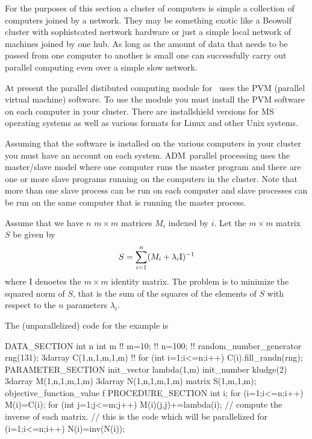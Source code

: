 %
%

For the purposes of this section a cluster of computers is
simple a collection of computers joined by a network. They may be
something exotic like a Beowolf cluster with sophistcated
nertwork hardware or just a simple local network of machines
joined by one hub. As long as the amount of data that needs to be passed
from one computer to another is small one can successfully carry out
parallel computing even over a simple slow network.

At present the parallel distibuted computing module for \ADM\
uses the PVM (parallel virtual machine) software. 
To use the module you must install the PVM software on each computer 
in your cluster. There are installshield versions for MS operating systems
as well as various formats for Linux and other Unix systems.

Assuming that the software is installed on the various computers in your cluster
you must have an account on each system. ADM\ parallel processing
uses the master/slave model where one computer runs the master program and
there are one or more slave programs running on the computers in the
cluster. Note that more than one slave process can be run on each computer
and slave processes can be run on the same computer that is running the
master process.

Assume that we have $n$ $m\times m$ matrices $M_i$ indexed by $i$.
Let the $m\times m$  matrix $S$ be given by
$$S=\sum_{i=1}^n (M_i+\lambda_i \hbox{\rm I})^{-1}$$
where I denoetes the $m\times m$ identity matrix.
The problem is to minimize the squared norm of $S$, that is the sum of the
squares of the elements of $S$ with respect to the $n$ parameters
$\lambda_i$.

The (unparallelized) code for the example is
\beginexample

DATA_SECTION
  int n
  int m
 !! m=10;
 !! n=100;
 !! random_number_generator rng(131);
  3darray C(1,n,1,m,1,m)
 !! for (int i=1;i<=n;i++) C(i).fill_randn(rng);
PARAMETER_SECTION
  init_vector lambda(1,m)
  init_number kludge(2)
  3darray M(1,n,1,m,1,m)
  3darray N(1,n,1,m,1,m)
  matrix S(1,m,1,m);
  objective_function_value f
PROCEDURE_SECTION
   int i;
   for (i=1;i<=n;i++)
   {
     M(i)=C(i);
     for (int j=1;j<=m;j++)
     {
       M(i)(j,j)+=lambda(i);
     }
   }
   // compute the inverse of each matrix. 
   // this is the code which will be parallelized
   for (i=1;i<=n;i++)
   {
     N(i)=inv(N(i));
   }

